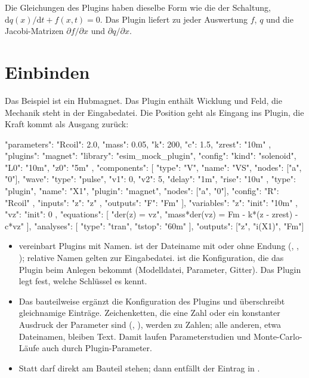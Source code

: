 Die Gleichungen des Plugins haben dieselbe Form wie die der Schaltung,
$\mathrm{d}q(x)/\mathrm{d}t + f(x,t) = 0$. Das Plugin liefert zu jeder
Auswertung $f$, $q$ und die Jacobi-Matrizen $\partial f/\partial x$ und
$\partial q/\partial x$.

\section{Einbinden}
\label{sec:plugin-einbinden}

Das Beispiel ist ein Hubmagnet. Das Plugin enthält Wicklung und Feld, die
Mechanik steht in der Eingabedatei. Die Position  geht als Eingang
ins Plugin, die Kraft kommt als Ausgang zurück:

\begin{json}
{
  "parameters": { "Rcoil": 2.0, "mass": 0.05, "k": 200, "c": 1.5, "zrest": "10m" },
  "plugins": {
    "magnet": { "library": "esim_mock_plugin",
                "config": { "kind": "solenoid", "L0": "10m", "z0": "5m" } }
  },
  "components": [
    { "type": "V", "name": "VS", "nodes": ["a", "0"],
      "wave": { "type": "pulse", "v1": 0, "v2": 5, "delay": "1m", "rise": "10u" } },
    { "type": "plugin", "name": "X1", "plugin": "magnet", "nodes": ["a", "0"],
      "config": { "R": "Rcoil" },
      "inputs":  { "z": "z" },
      "outputs": { "F": "Fm" } }
  ],
  "variables": { "z": { "init": "10m" }, "vz": { "init": 0 } },
  "equations": [
    "der(z) = vz",
    "mass*der(vz) = Fm - k*(z - zrest) - c*vz"
  ],
  "analyses": [ { "type": "tran", "tstop": "60m" } ],
  "outputs": ["z", "i(X1)", "Fm"]
}
\end{json}

\begin{itemize}
  \item {} vereinbart Plugins mit Namen.  ist der
    Dateiname mit oder ohne Endung (, ,
    ); relative Namen gelten zur Eingabedatei. 
    ist die Konfiguration, die das Plugin beim Anlegen bekommt (Modelldatei,
    Parameter, Gitter). Das Plugin legt fest, welche Schlüssel es kennt.
  \item Das bauteilweise  ergänzt die Konfiguration des Plugins
    und überschreibt gleichnamige Einträge. Zeichenketten, die eine Zahl
    oder ein konstanter Ausdruck der Parameter sind (,
    ), werden zu Zahlen; alle anderen, etwa Dateinamen, bleiben
    Text. Damit laufen Parameterstudien und Monte-Carlo-Läufe auch durch
    Plugin-Parameter.
  \item Statt  darf  direkt am Bauteil
    stehen; dann entfällt der Eintrag in .
\end{itemize}

